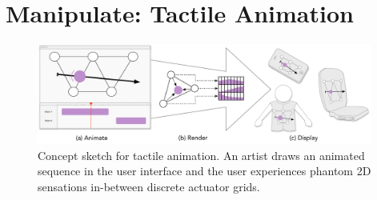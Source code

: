 %
%
%
%
%
%
%
%
%
%



\chapter{Manipulate: Tactile Animation}
\label{ch:hapticanimation}

\begin{figure}[h]
   \includegraphics[width=0.98\textwidth]{images/HA14-Concept-Sketch-2015-01-17-1127}
   \caption{Concept sketch for tactile animation. 
An artist draws an animated sequence in the user interface and the user experiences phantom 2D sensations in-between discrete actuator grids. 
}
   \label{fig:concept:sketch}
\end{figure}

